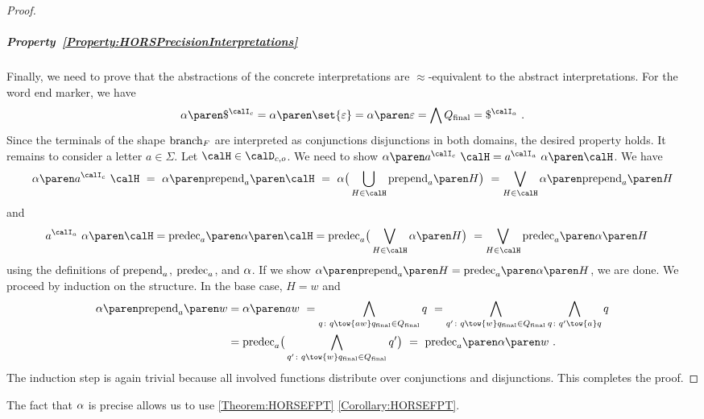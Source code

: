 \documentclass[../../diss.tex]{subfiles}
\begin{document}
\begin{proof}
    \subparagraph{Property~\ref{Property:HORSPrecisionInterpretations}}
    Finally, we need to prove that the abstractions of the concrete interpretations are $\approx$-equivalent to the abstract interpretations.
    For the word end marker, we have
    \[
        \abs{\wordend^{\interpretationc}} = \abs{ \set{\eps}} = \abs{\eps} = \bigwedge \QF = \wordend^{\interpretationa}
        \ .
    \]
    Since the terminals of the shape $\text{branch}_F$ are interpreted as conjunctions \resp disjunctions in both domains, the desired property holds.
    It remains to consider a letter $a \in \Sigma$. Let $\sof \in \domainc{\ground}$.
    We need to show $\abs{ a^{\interpretationc} \appl \sof } = a^{\interpretationa} \appl \abs{\sof}$.
    We have
    \[
        \abs{ a^{\interpretationc} \appl \sof }
        \ = \ \abs{ \prepend{a}{\sof}}
        \ = \ \abs \big( \bigcup_{H \in \sof} \prepend{a}{H} \big)
        \ = \bigvee_{H \in \sof} \abs{\prepend{a}{H}}
    \]
    and
    \begin{align*}
        a^{\interpretationa} \appl \abs{\sof}
        &= \predec{a}{\abs{\sof}}
        = \predec{a} \big( \bigvee_{H \in \sof} \abs{H} \big)
        \ = \bigvee_{H \in \sof} \predec{a}{\abs{H}}
    \end{align*}
    using the definitions of $\prepend{a}$, $\predec{a}$, and $\abs$.
    If we show $\abs{\prepend{a}{H}} = \predec{a}{\abs{H}}$, we are done.
    We proceed by induction on the structure.
    In the base case, $H = w$ and
    \begin{align*}
        \abs{\prepend{a}{w}}
        &=
        \abs{aw}
        \ =
        \bigwedge_{q \colon q \tow{aw} \qfinal \in \QF} q
        \ =
        \bigwedge_{q' \colon q \tow{w} \qfinal \in \QF}
        \bigwedge_{q \colon q' \tow{a} q} q
        \\
        &=
        \predec{a} \big( \bigwedge_{q' \colon q \tow{w} \qfinal \in \QF} q' \big)
        \ = \
        \predec{a}{\abs{w} }
        \ .
    \end{align*}
    The induction step is again trivial because all involved functions distribute over conjunctions and disjunctions.
    This completes the proof.
\end{proof}

The fact that $\abs$ is precise allows us to use \cref{Theorem:HORSEFPT} \resp \cref{Corollary:HORSEFPT}.
\end{document}
